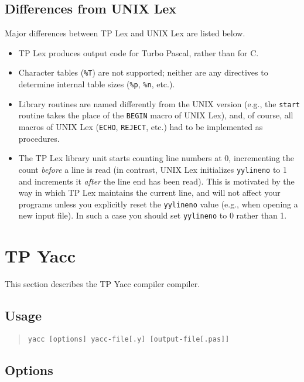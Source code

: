 \subsection{Differences from UNIX Lex}

Major differences between TP Lex and UNIX Lex are listed below.

\begin{itemize}
   \item
      TP Lex produces output code for Turbo Pascal, rather than for C.
   \item
      Character tables (\verb"%T") are not supported; neither are any
      directives to determine internal table sizes (\verb"%p", \verb"%n",
      etc.).
   \item
      Library routines are named differently from the UNIX version (e.g.,
      the \verb"start" routine takes the place of the \verb"BEGIN" macro of
      UNIX Lex), and, of course, all macros of UNIX Lex (\verb"ECHO",
      \verb"REJECT", etc.) had to be implemented as procedures.
    \item
      The TP Lex library unit starts counting line numbers at 0, incrementing
      the count {\em before\/} a line is read (in contrast, UNIX Lex
      initializes \verb"yylineno" to 1 and increments it {\em after\/} the
      line end has been read). This is motivated by the way in which TP Lex
      maintains the current line, and will not affect your programs unless you
      explicitly reset the \verb"yylineno" value (e.g., when opening a new
      input file). In such a case you should set \verb"yylineno" to 0 rather
      than 1.
\end{itemize}

\section{TP Yacc}

This section describes the TP Yacc compiler compiler.

\subsection{Usage}

\begin{quote}\begin{verbatim}
yacc [options] yacc-file[.y] [output-file[.pas]]
\end{verbatim}\end{quote}

\subsection{Options}

